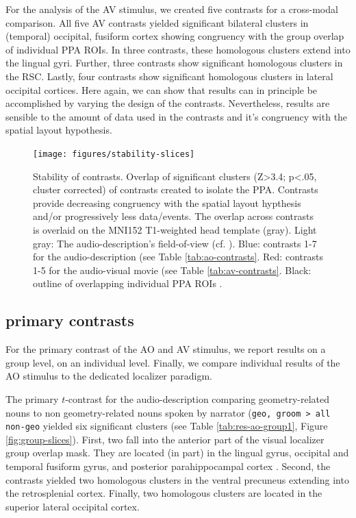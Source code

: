 \documentclass[english]{article}
\begin{document}
For the analysis of the AV stimulus, we created five contrasts for a cross-modal
comparison.
All five AV contrasts yielded significant bilateral clusters in (temporal)
occipital, fusiform cortex showing congruency with the group overlap of
individual PPA ROIs.
In three contrasts, these homologous clusters extend into the lingual gyri.
Further, three contrasts show significant homologous clusters in the RSC.
Lastly, four contrasts show significant homologous clusters in lateral occipital
cortices.
Here again, we can show that results can in principle be accomplished by varying
the design of the contrasts. Nevertheless, results are sensible to the amount of
data used in the contrasts and it's congruency with the spatial layout
hypothesis.

\begin{figure} \centering
    \texttt{[image: figures/stability-slices]}
    \caption{Stability of contrasts. Overlap of significant clusters (Z>3.4;
        p<.05, cluster corrected) of contrasts created to isolate the PPA.
        Contrasts provide decreasing congruency with the spatial layout
        hypthesis and/or progressively less data/events. The overlap across
        contrasts is overlaid on the MNI152 T1-weighted head template (gray).
        Light gray: The audio-description's field-of-view (cf.
        \citep{hanke2014audiomovie}).  Blue: contrasts 1-7 for the
        audio-description (see Table \ref{tab:ao-contrasts}.  Red: contrasts 1-5
        for the audio-visual movie (see Table \ref{tab:av-contrasts}.  Black:
        outline of overlapping individual PPA ROIs
        \citep{sengupta2016extension}.} \label{fig:stability-slices}
    \end{figure}


\subsection{primary contrasts}
For the primary contrast of the AO and AV stimulus, we report results on a group
level, on an individual level. Finally, we compare individual results of the AO
stimulus to the dedicated localizer paradigm.

The primary $t$-contrast for the audio-description comparing geometry-related
nouns to non geometry-related nouns spoken by narrator (\texttt{geo, groom > all
non-geo} yielded six significant clusters (see Table \ref{tab:res-ao-group1},
Figure \ref{fig:group-slices}).
First, two fall into the anterior part of the visual localizer group overlap
mask.
They are located (in part) in the lingual gyrus, occipital and temporal fusiform
gyrus, and posterior parahippocampal cortex .
Second, the contrasts yielded two homologous clusters in the ventral precuneus extending into the retrosplenial cortex.
Finally, two homologous clusters are located in the superior lateral occipital cortex.
\end{document}
